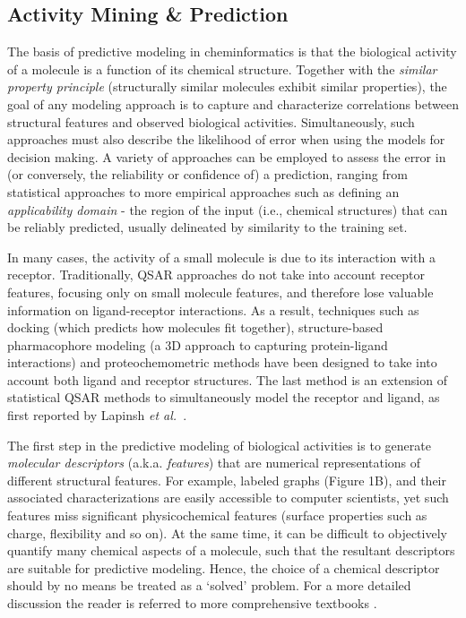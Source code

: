 \documentclass{sig-alternate}
\begin{document}
\subsection{Activity Mining \& Prediction}
\label{sec:activity-mining}


The basis of predictive modeling in cheminformatics is that the
biological activity of a molecule is a function of its chemical
structure. Together with the \emph{similar property principle}
\cite{Johnson:1990qf} (structurally similar molecules exhibit
similar properties), the goal of any modeling approach is to capture
and characterize correlations between structural features and
observed biological activities. Simultaneously, such approaches must
also describe the likelihood of error when using the
models for decision making.  A variety of approaches can be employed
to assess the error in (or conversely, the reliability or confidence of) a
prediction, ranging from statistical approaches to more
empirical approaches such as defining an \emph{applicability domain} -
the region of the input (i.e., chemical structures) that can be
reliably predicted, usually delineated by similarity
to the training set.

In many cases, the activity of a small molecule is due to its
interaction with a receptor. Traditionally, QSAR \cite{Hansch:1962vn,
 Free:1964ys} approaches do not take into account receptor features,
focusing only on small molecule features, and therefore lose valuable
information on ligand-receptor interactions. As a result, techniques
such as docking (which predicts how molecules fit together),
structure-based pharmacophore modeling (a 3D approach to capturing protein-ligand
interactions) and proteochemometric methods have been designed to take
into account both ligand and receptor structures. The last method is
an extension of statistical QSAR methods to simultaneously
model the receptor and ligand, as first reported by Lapinsh \textit{et
 al.}~\cite{lapinsh2001}.

The first step in the predictive modeling of biological activities is
to generate \emph{molecular descriptors} (a.k.a. \emph{features}) that
are numerical representations of different structural features. For
example, labeled graphs (Figure 1B), and their associated
characterizations are easily accessible to computer scientists, yet
such features miss significant physicochemical features (surface
properties such as charge, flexibility and so on). At the same time,
it can be difficult to objectively quantify many chemical aspects of a
molecule, such that the resultant descriptors are suitable for
predictive modeling.  Hence, the choice of a chemical descriptor
should by no means be treated as a ‘solved’ problem. For a more
detailed discussion the reader is referred to more comprehensive
textbooks \cite{todeschini2000,faulon2010}.
\end{document}

